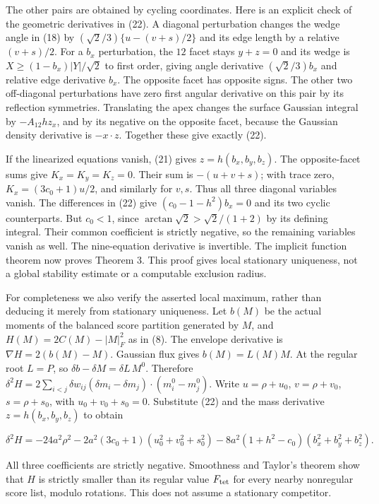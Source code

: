 \documentclass[
  11pt,
]{article}
\begin{document}
The other pairs are obtained by cycling coordinates. Here is an explicit
check of the geometric derivatives in (22). A diagonal perturbation
changes the wedge angle in (18) by \((\sqrt2/3)\{u-(v+s)/2\}\) and its
edge length by a relative \((v+s)/2\). For a \(b_x\) perturbation, the
\(12\) facet stays \(y+z=0\) and its wedge is \(X\ge(1-b_x)|Y|/\sqrt2\)
to first order, giving angle derivative \((\sqrt2/3)b_x\) and relative
edge derivative \(b_x\). The opposite facet has opposite signs. The
other two off-diagonal perturbations have zero first angular derivative
on this pair by its reflection symmetries. Translating the apex changes
the surface Gaussian integral by \(-A_{12}h z_x\), and by its negative
on the opposite facet, because the Gaussian density derivative is
\(-x\cdot z\). Together these give exactly (22).

If the linearized equations vanish, (21) gives \(z=h(b_x,b_y,b_z)\). The
opposite-facet sums give \(K_x=K_y=K_z=0\). Their sum is \(-(u+v+s)\);
with trace zero, \(K_x=(3c_0+1)u/2\), and similarly for \(v,s\). Thus
all three diagonal variables vanish. The differences in (22) give
\((c_0-1-h^2)b_x=0\) and its two cyclic counterparts. But \(c_0<1\),
since \(\arctan\sqrt2>\sqrt2/(1+2)\) by its defining integral. Their
common coefficient is strictly negative, so the remaining variables
vanish as well. The nine-equation derivative is invertible. The implicit
function theorem now proves Theorem 3. This proof gives local stationary
uniqueness, not a global stability estimate or a computable exclusion
radius.

For completeness we also verify the asserted local maximum, rather than
deducing it merely from stationary uniqueness. Let \(b(M)\) be the
actual moments of the balanced score partition generated by \(M\), and
\(H(M)=2C(M)-|M|_F^2\) as in (8). The envelope derivative is
\(\nabla H=2(b(M)-M)\). Gaussian flux gives \(b(M)=L(M)M\). At the
regular root \(L=P\), so \(\delta b-\delta M=\delta L\,M^0\). Therefore
\(\delta^2H=2\sum_{i<j}\delta w_{ij}
  (\delta m_i-\delta m_j)\cdot(m_i^0-m_j^0)\). Write \(u=\rho+u_0\),
\(v=\rho+v_0\), \(s=\rho+s_0\), with \(u_0+v_0+s_0=0\). Substitute (22)
and the mass derivative \(z=h(b_x,b_y,b_z)\) to obtain

\[
 \delta^2H=-24a^2\rho^2
  -2a^2(3c_0+1)(u_0^2+v_0^2+s_0^2)
  -8a^2(1+h^2-c_0)(b_x^2+b_y^2+b_z^2).                 \tag{24}
\]

All three coefficients are strictly negative. Smoothness and Taylor's
theorem show that \(H\) is strictly smaller than its regular value
\(F_{\rm tet}\) for every nearby nonregular score list, modulo
rotations. This does not assume a stationary competitor.
\end{document}
